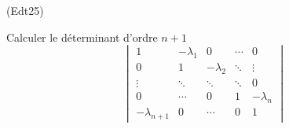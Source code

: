 \begin{tiny}(Edt25)\end{tiny} Calculer le déterminant d'ordre $n+1$
\begin{displaymath}
 \begin{vmatrix}
  1            & -\lambda_1  & 0          & \cdots & 0    \\
  0            & 1           & -\lambda_2 & \ddots &\vdots \\
\vdots         & \ddots      & \ddots     & \ddots & 0     \\
0              & \cdots      & 0          & 1      & -\lambda_n      \\
-\lambda_{n+1} & 0           & \cdots     & 0      & 1    
 \end{vmatrix}
\end{displaymath}
